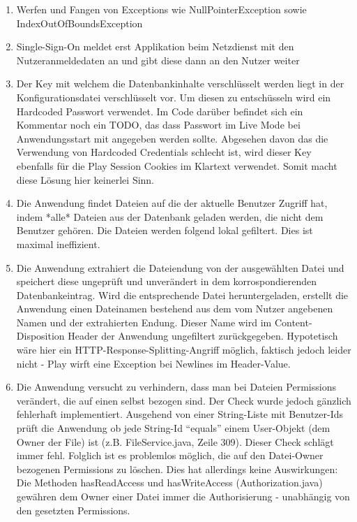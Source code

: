 \documentclass[12pt,DIV14,BCOR10mm,a4paper,parskip=half-,headsepline,headinclude,english,ngerman,bibliography=totocnumbered]{scrreprt}
\begin{document}
\begin{enumerate}[resume]
  \item Werfen und Fangen von Exceptions wie NullPointerException sowie IndexOutOfBoundsException
  \item Single-Sign-On meldet erst Applikation beim Netzdienst mit den Nutzeranmeldedaten an und gibt diese dann an den Nutzer weiter
  \item Der Key mit welchem die Datenbankinhalte verschlüsselt werden liegt in der Konfigurationsdatei verschlüsselt vor. Um diesen zu entschüsseln wird ein Hardcoded Passwort verwendet. Im Code darüber befindet sich ein Kommentar noch ein TODO, das dass Passwort im Live Mode bei Anwendungsstart mit angegeben werden sollte. Abgesehen davon das die Verwendung von Hardcoded Credentials schlecht ist, wird dieser Key ebenfalls für die Play Session Cookies im Klartext verwendet. Somit macht diese Lösung hier keinerlei Sinn.
  \item Die Anwendung findet Dateien auf die der aktuelle Benutzer Zugriff hat, indem *alle* Dateien aus der Datenbank geladen werden, die nicht dem Benutzer gehören. Die Dateien werden folgend lokal gefiltert. Dies ist maximal ineffizient.
  \item Die Anwendung extrahiert die Dateiendung von der ausgewählten Datei und speichert diese ungeprüft und unverändert in dem korrospondierenden Datenbankeintrag. Wird die entsprechende Datei heruntergeladen, erstellt die Anwendung einen Dateinamen bestehend aus dem vom Nutzer angebenen Namen und der extrahierten Endung. Dieser Name wird im Content-Disposition Header der Anwendung ungefiltert zurückgegeben. Hypotetisch wäre hier ein HTTP-Response-Splitting-Angriff möglich, faktisch jedoch leider nicht - Play wirft eine Exception bei Newlines im Header-Value.
  \item Die Anwendung versucht zu verhindern, dass man bei Dateien Permissions verändert, die auf einen selbst bezogen sind. Der Check wurde jedoch gänzlich fehlerhaft implementiert. Ausgehend von einer String-Liste mit Benutzer-Ids prüft die Anwendung ob jede String-Id \enquote{equals} einem User-Objekt (dem Owner der File) ist (z.B. FileService.java, Zeile 309). Dieser Check schlägt immer fehl. Folglich ist es problemlos möglich, die auf den Datei-Owner bezogenen Permissions zu löschen. Dies hat allerdings keine Auswirkungen: Die Methoden hasReadAccess und hasWriteAccess (Authorization.java) gewähren dem Owner einer Datei immer die Authorisierung - unabhängig von den gesetzten Permissions.

\end{enumerate}
\end{document}
